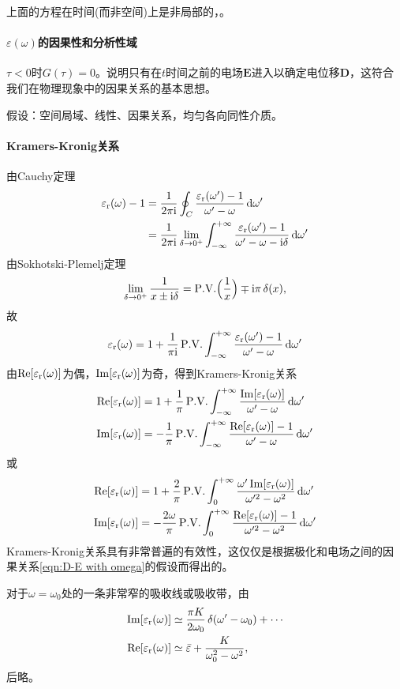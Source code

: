 上面的方程在时间(而非空间)上是非局部的，。
\paragraph{$\varepsilon(\omega)$的因果性和分析性域}
$\tau<0$时$G(\tau)=0$。说明只有在$t$时间之前的电场$\bm E$进入以确定电位移$\bm D$，这符合我们在物理现象中的因果关系的基本思想。

假设：空间局域、线性、因果关系，均匀各向同性介质。
\paragraph{Kramers-Kronig关系}
由Cauchy定理
\begin{align*}
    \varepsilon_\text r(\omega)-1&=\frac1{2\pi\mathrm{i}}\oint_C\frac{\varepsilon_\text r(\omega')-1}{\omega'-\omega}\mathop{}\!\mathrm{d}\omega'\\
    &=\frac1{2\pi\mathrm{i}}\lim_{\delta\to0^+}\int_{-\infty}^{+\infty}\frac{\varepsilon_\text r(\omega')-1}{\omega'-\omega-\mathrm{i}\delta}\mathop{}\!\mathrm{d}\omega'
\end{align*}
由Sokhotski-Plemelj定理
\[
    \lim_{\delta\to0^+}\frac1{x\pm\mathrm{i}\delta}=\mathrm{P.V.}\Bigl(\frac1x\Bigr)\mp\mathrm{i}\pi\mathop{}\!\delta(x),
\]
故
\[
    \varepsilon_\text r(\omega)=1+\frac1{\pi\mathrm{i}}\,\mathrm{P.V.}\int_{-\infty}^{+\infty}\frac{\varepsilon_\text r(\omega')-1}{\omega'-\omega}\mathop{}\!\mathrm{d}\omega'
\]
由$\operatorname{Re}[\varepsilon_\text r(\omega)]$为偶，$\operatorname{Im}[\varepsilon_\text r(\omega)]$为奇，得到Kramers-Kronig关系
\begin{equation}
    \begin{aligned}
        \operatorname{Re}[\varepsilon_\text r(\omega)]&=1+\frac1\pi\,\mathrm{P.V.}\int_{-\infty}^{+\infty}\frac{\operatorname{Im}[\varepsilon_\text r(\omega)]}{\omega'-\omega}\mathop{}\!\mathrm{d}\omega'\\
        \operatorname{Im}[\varepsilon_\text r(\omega)]&=-\frac1\pi\,\mathrm{P.V.}\int_{-\infty}^{+\infty}\frac{\operatorname{Re}[\varepsilon_\text r(\omega)]-1}{\omega'-\omega}\mathop{}\!\mathrm{d}\omega'\\
    \end{aligned}
\end{equation}
或
\begin{equation}
    \begin{aligned}
        \operatorname{Re}[\varepsilon_\text r(\omega)]&=1+\frac2\pi\,\mathrm{P.V.}\int_0^{+\infty}\frac{\omega'\operatorname{Im}[\varepsilon_\text r(\omega)]}{\omega'^2-\omega^2}\mathop{}\!\mathrm{d}\omega'\\
        \operatorname{Im}[\varepsilon_\text r(\omega)]&=-\frac{2\omega}\pi\,\mathrm{P.V.}\int_0^{+\infty}\frac{\operatorname{Re}[\varepsilon_\text r(\omega)]-1}{\omega'^2-\omega^2}\mathop{}\!\mathrm{d}\omega'\\
    \end{aligned}
\end{equation}
Kramers-Kronig关系具有非常普遍的有效性，这仅仅是根据极化和电场之间的因果关系\eqref{eqn:D-E with omega}的假设而得出的。

对于$\omega=\omega_0$处的一条非常窄的吸收线或吸收带，由
\begin{align*}
    \operatorname{Im}[\varepsilon_\text r(\omega)]&\simeq\frac{\pi K}{2\omega_0}\mathop{}\!\delta(\omega'-\omega_0)+\cdots\\
    \operatorname{Re}[\varepsilon_\text r(\omega)]&\simeq\bar\varepsilon+\frac K{\omega_0^2-\omega^2},
\end{align*}
后略。

